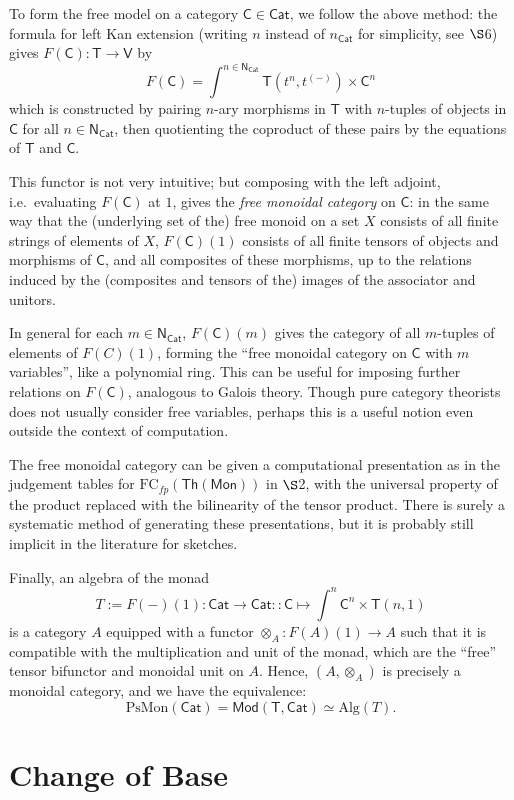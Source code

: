 \documentclass{amsart}
\theoremstyle{definition}
\newcommand{\Th}{\mathsf{Th}}
\newcommand{\Cat}{\mathsf{Cat}}
\newcommand{\Mon}{\mathsf{Mon}}
\newcommand{\Mod}{\mathsf{Mod}}
\newcommand{\NN}{\mathsf{N}}
\newcommand{\V}{\mathsf{V}}
\newcommand{\C}{\mathsf{C}}
\newcommand{\T}{\mathsf{T}}
\newcommand{\FC}{\mathrm{FC}}
\newcommand{\maps}{\colon}
\begin{document}
To form the free model on a category $\C\in \Cat$, we follow the above method: the formula for left Kan extension (writing $n$ instead of $n_\Cat$ for simplicity, see $\S$6) gives $F(\C)\maps \T\to \V$ by $$F(\C) = \int^{n\in \NN_\Cat} \T(t^{n},t^{(-)})\times \C^{n}$$ which is constructed by pairing $n$-ary morphisms in $\T$ with $n$-tuples of objects in $\C$ for all $n\in \NN_\Cat$, then quotienting the coproduct of these pairs by the equations of $\T$ and $\C$.

This functor is not very intuitive; but composing with the left adjoint, i.e.\ evaluating $F(\C)$ at $1$, gives the \textit{free monoidal category} on $\C$: in the same way that the (underlying set of the) free monoid on a set $X$ consists of all finite strings of elements of $X$, $F(\C)(1)$ consists of all finite tensors of objects and morphisms of $\C$, and all composites of these morphisms, up to the relations induced by the (composites and tensors of the) images of the associator and unitors.

In general for each $m\in \NN_\Cat$, $F(\C)(m)$ gives the category of all $m$-tuples of elements of $F(C)(1)$, forming the ``free monoidal category on $\C$ with $m$ variables'', like a polynomial ring. This can be useful for imposing further relations on $F(\C)$, analogous to Galois theory. Though pure category theorists does not usually consider free variables, perhaps this is a useful notion even outside the context of computation.

The free monoidal category can be given a computational presentation as in the judgement tables for $\FC_{fp}(\Th(\Mon))$ in $\S$2, with the universal property of the product replaced with the bilinearity of the tensor product. There is surely a systematic method of generating these presentations, but it is probably still implicit in the literature for sketches.

Finally, an algebra of the monad 
\[  T:= F(-)(1)\maps \Cat\to \Cat :: \C \mapsto \int^n \C^n \times \T(n,1) \]
is a category $A$ equipped with a functor $\otimes_A\maps F(A)(1)\to A$ such that it is compatible with the multiplication and unit of the monad, which are the ``free'' tensor bifunctor and monoidal unit on $A$. Hence, $(A,\otimes_A)$ is precisely a monoidal category, and we have the equivalence: \[ \mathrm{PsMon}(\Cat) = \Mod(\T,\Cat) \simeq \mathrm{Alg}(T). \]

\section{Change of Base}
\end{document}
